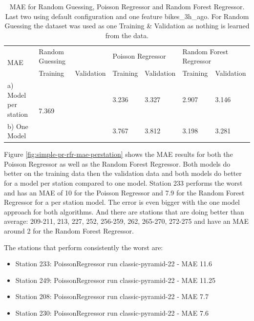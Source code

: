 \documentclass[a4paper]{article}
\begin{document}
    \begin{table}[h]
        \centering
        \begin{tabularx}{\textwidth}{|X|XX|XX|XX|}
            \hline
            \multirow{2}{*}{MAE} & \multicolumn{1}{l|}{Random Guessing} & & \multicolumn{2}{l|}{Poisson Regressor} & \multicolumn{2}{l|}{Random Forest Regressor} \\ \cline{2-7}
            & \multicolumn{1}{l|}{Training} & Validation & \multicolumn{1}{l|}{Training} & Validation & \multicolumn{1}{l|}{Training} & Validation \\ \hline
            a) Model per station & \multicolumn{2}{l|}{\multirow{2}{*}{7.369}} & \multicolumn{1}{l|}{3.236}    & 3.327      & \multicolumn{1}{l|}{2.907}    & 3.146      \\ \cline{1-1} \cline{4-7}
            b) One Model & \multicolumn{2}{l|}{} & \multicolumn{1}{l|}{3.767} & 3.812 & \multicolumn{1}{l|}{3.198}    & 3.281      \\ \hline
        \end{tabularx}
        \caption{MAE for Random Guessing, Poisson Regressor and Random Forest Regressor. Last two using default configuration and one feature bikes\_3h\_ago. For
        Random Guessing the dataset was used as one Training \& Validation as nothing is learned from the data.}
        \label{tbl:phase1-step2-simple-model-mae}
    \end{table}

    Figure \ref{fig:simple-pr-rfr-mae-perstation} shows the MAE results for both the Poisson Regressor as well as the
    Random Forest Regressor. Both models do better on the training data then the validation data and both models do
    better for a model per station compared to one model. Station 233 performs the worst and has an MAE of 10 for the
    Poisson Regressor and 7.9 for the Random Forest Regressor for a per station model. The error is even bigger with the
    one model approach for both algorithms. And there are stations that are doing better than average: 209-211, 213, 227,
    252, 256-259, 262, 265-270, 272-275 and have an MAE around 2 for the Random Forest Regressor.

    The stations that perform consistently the worst are:
    \begin{itemize}
        \item Station 233: PoissonRegressor run classic-pyramid-22 - MAE 11.6
        \item Station 249: PoissonRegressor run classic-pyramid-22 - MAE 11.25
        \item Station 208: PoissonRegressor run classic-pyramid-22 - MAE 7.7
        \item Station 230: PoissonRegressor run classic-pyramid-22 - MAE 7.6
    \end{itemize}
\end{document}
